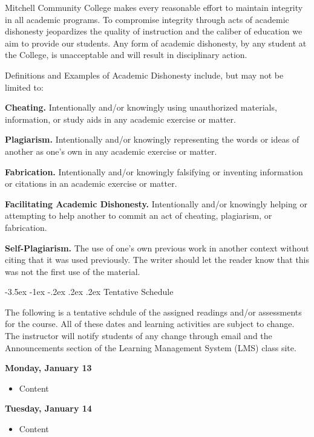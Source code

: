 \documentclass{article}
\makeatletter
\renewcommand\section{\@startsection{section}{1}{0pt}%
  {-3.5ex \@plus -1ex \@minus -.2ex}%
  {.2ex \@plus.2ex}%
  {\normalfont\Large\bfseries}} %
\makeatother
\begin{document}
Mitchell Community College makes every reasonable effort to maintain integrity in all academic programs. To compromise integrity through acts of academic dishonesty jeopardizes the quality of instruction and the caliber of education we aim to provide our students.  Any form of academic dishonesty, by any student at the College, is unacceptable and will result in disciplinary action.

Definitions and Examples of Academic Dishonesty include, but may not be limited to:

\textbf{Cheating.} Intentionally and/or knowingly using unauthorized materials, information, or study aids in any academic exercise or matter.

\textbf{Plagiarism.} Intentionally and/or knowingly representing the words or ideas of another as one's own in any academic exercise or matter.

\textbf{Fabrication.} Intentionally and/or knowingly falsifying or inventing information or citations in an academic exercise or matter.

\textbf{Facilitating Academic Dishonesty.} Intentionally and/or knowingly helping or attempting to help another to commit an act of cheating, plagiarism, or fabrication.

\textbf{Self-Plagiarism.} The use of one's own previous work in another context without citing that it was used previously. The writer should let the reader know that this was not the first use of the material.

\section{Tentative Schedule}

The following is a tentative schdule of the assigned readings and/or assessments for the course. All of these dates and learning activities are subject to change. The instructor will notify students of any change through email and the Announcements section of the Learning Management System (LMS) class site.

\textbf{Monday, January 13}

\begin{itemize}
\item Content
\end{itemize}

\textbf{Tuesday, January 14}

\begin{itemize}
\item Content
\end{itemize}
\end{document}
